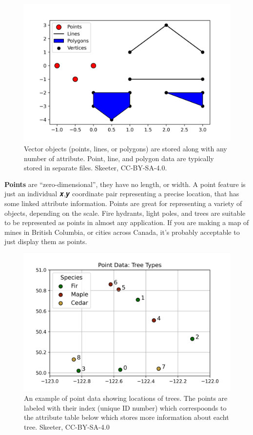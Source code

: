 \documentclass[
]{book}
\begin{document}
\begin{figure}
\includegraphics[width=0.75\linewidth]{images/03-vector-types} \caption{Vector objects (points, lines, or polygons) are stored along with any number of attribute.  Point, line, and polygon data are typically stored in separate files. Skeeter, CC-BY-SA-4.0.}\label{fig:3-vector-types}
\end{figure}

\textbf{Points} are ``zero-dimensional'', they have no length, or width. A point feature is just an individual 𝒙,𝒚 coordinate pair representing a precise location, that has some linked attribute information. Points are great for representing a variety of objects, depending on the scale. Fire hydrants, light poles, and trees are suitable to be represented as points in almost any application. If you are making a map of mines in British Columbia, or cities across Canada, it's probably acceptable to just display them as points.

\begin{figure}
\includegraphics[width=0.75\linewidth]{images/03-vector-points} \caption{An example of point data showing locations of trees.  The points are labeled with their index (unique ID number) which correspoonds to the attribute table below which stores more information about eacht tree. Skeeter, CC-BY-SA-4.0}\label{fig:3-vector-points}
\end{figure}
\end{document}
